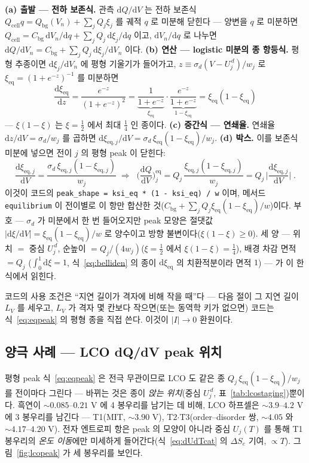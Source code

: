 \documentclass[11pt,a4paper]{article}
\newcommand{\dd}{\mathrm{d}}
\newcommand{\eq}{\mathrm{eq}}
\newcommand{\cell}{\mathrm{cell}}
\newcommand{\bg}{\mathrm{bg}}
\newcommand{\code}[1]{\texttt{#1}}
\begin{document}
\textbf{(a) 출발 — 전하 보존식.} 관측 $\dd Q/\dd V$ 는 전하 보존식 $Q_\cell q=Q_\bg(V_n)+\sum_jQ_j\xi_j$ 를 궤적
$q$ 로 미분해 닫힌다 — 양변을 $q$ 로 미분하면 $Q_\cell=C_\bg\,\dd V_n/\dd q+\sum_jQ_j\,\dd\xi_j/\dd q$ 이고,
$\dd V_n/\dd q$ 로 나누면 $\dd Q/\dd V_n=C_\bg+\sum_jQ_j\,\dd\xi_j/\dd V_n$ 이다. \textbf{(b) 연산 — logistic
미분의 종 항등식.} 평형 추종이면 $\dd\xi_j/\dd V_n$ 에 평형 기울기가 들어가고, $z\equiv\sigma_d(V-U_j^{\,d})/w_j$ 로
$\xi_\eq=(1+e^{-z})^{-1}$ 를 미분하면
\begin{equation}
\frac{\dd\xi_\eq}{\dd z}=\frac{e^{-z}}{(1+e^{-z})^2}
=\underbrace{\frac{1}{1+e^{-z}}}_{\xi_\eq}\cdot\underbrace{\frac{e^{-z}}{1+e^{-z}}}_{1-\xi_\eq}
=\xi_\eq(1-\xi_\eq)
\label{eq:belliden}
\end{equation}
— $\xi(1-\xi)$ 는 $\xi=\tfrac12$ 에서 최대 $\tfrac14$ 인 종이다. \textbf{(c) 중간식 — 연쇄율.} 연쇄율
$\dd z/\dd V=\sigma_d/w_j$ 를 곱하면 $\dd\xi_{\eq,j}/\dd V=\sigma_d\,\xi_\eq(1-\xi_\eq)/w_j$. \textbf{(d) 박스.}
이를 보존식 미분에 넣으면 전이 $j$ 의 평형 peak 이 닫힌다:
\begin{equation}
\frac{\dd\xi_{\eq,j}}{\dd V}=\frac{\sigma_d\,\xi_{\eq,j}(1-\xi_{\eq,j})}{w_j}
\;\Longrightarrow\;
\boxed{\;\Big(\frac{\dd Q}{\dd V}\Big)^\eq_j
=Q_j\,\frac{\xi_{\eq,j}(1-\xi_{\eq,j})}{w_j}
=Q_j\,\Big|\frac{\dd\xi_{\eq,j}}{\dd V}\Big|\;.}
\label{eq:eqpeak}
\end{equation}
이것이 코드의 \code{peak\_shape = ksi\_eq * (1 - ksi\_eq) / w} 이며, 메서드 \code{equilibrium} 이 전이별로 이 항만
합산한 것($C_\bg+\sum_jQ_j\xi_\eq(1-\xi_\eq)/w$)이다. 부호 — $\sigma_d$ 가 미분에서 한 번 들어오지만 peak 모양은
절댓값 $|\dd\xi/\dd V|=\xi_\eq(1-\xi_\eq)/w$ 로 양수이고 방향 불변이다($\xi(1-\xi)\ge0$). 세 양 — 위치 $=$ 중심
$U_j^{\,d}$, 순높이 $=Q_j/(4w_j)$($\xi=\tfrac12$ 에서 $\xi(1-\xi)=\tfrac14$), 배경 차감 면적 $=Q_j$
($\int_0^1\dd\xi=1$, 식~\eqref{eq:belliden} 의 종이 $\dd\xi_\eq$ 의 치환적분이라 면적 $1$) — 가 이 한 식에서 읽힌다.

코드의 사용 조건은 ``지연 길이가 격자에 비해 작을 때''다 — 다음 절이 그 지연 길이 $L_V$ 를 세우고, $L_V$ 가 격자
몇 칸보다 작으면(또는 동역학 키가 없으면) 코드는 식~\eqref{eq:eqpeak} 의 평형 종을 직접 쓴다. 이것이 $|I|\to0$ 환원이다.

\subsection{양극 사례 — LCO dQ/dV peak 위치}\label{sub:lcopeak}
평형 peak 식~\eqref{eq:eqpeak} 은 전극 무관이므로 LCO 도 같은 종 $Q_j\,\xi_\eq(1-\xi_\eq)/w_j$ 를 전이마다 그린다 —
바뀌는 것은 종이 \emph{앉는 위치}(중심 $U_j^{\,d}$, 표~\ref{tab:lcostaging})뿐이다. 흑연이 $\sim0.085$--$0.21$ V 에
4 봉우리를 남기는 데 비해, LCO 하프셀은 $\sim3.9$--$4.2$ V 에 3 봉우리를 남긴다 — T1(MIT, $\sim3.90$ V),
T2$\cdot$T3(order--disorder 쌍, $\sim4.05$ 와 $\sim4.17$--$4.20$ V). 전자 엔트로피 항은 peak 의 모양이 아니라 중심
$U_j(T)$ 를 통해 T1 봉우리의 \emph{온도 이동}에만 미세하게 들어간다(식~\eqref{eq:dUdTcat} 의 $\Delta S_e$ 기여,
$\propto T$). 그림~\ref{fig:lcopeak} 가 세 봉우리를 보인다.
\end{document}
